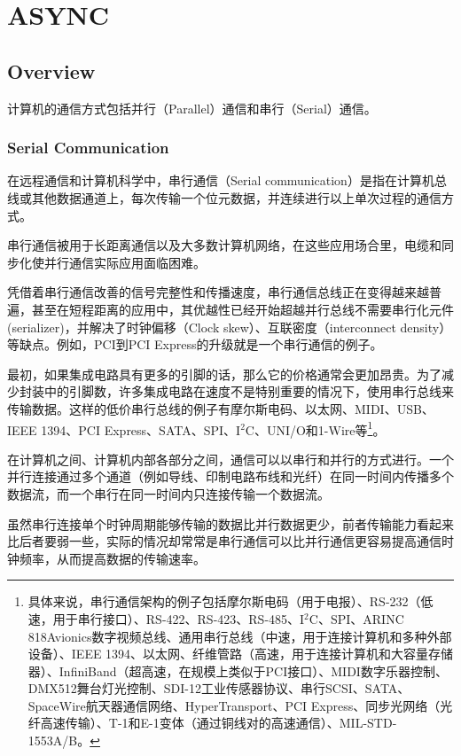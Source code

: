\part{ASYNC}


\chapter{Overview}


计算机的通信方式包括并行（Parallel）通信和串行（Serial）通信。


\section{Serial Communication}

在远程通信和计算机科学中，串行通信（Serial communication）是指在计算机总线或其他数据通道上，每次传输一个位元数据，并连续进行以上单次过程的通信方式。

串行通信被用于长距离通信以及大多数计算机网络，在这些应用场合里，电缆和同步化使并行通信实际应用面临困难。

凭借着串行通信改善的信号完整性和传播速度，串行通信总线正在变得越来越普遍，甚至在短程距离的应用中，其优越性已经开始超越并行总线不需要串行化元件(serializer)，并解决了时钟偏移（Clock skew）、互联密度（interconnect density）等缺点。例如，PCI到PCI Express的升级就是一个串行通信的例子。

最初，如果集成电路具有更多的引脚的话，那么它的价格通常会更加昂贵。为了减少封装中的引脚数，许多集成电路在速度不是特别重要的情况下，使用串行总线来传输数据。这样的低价串行总线的例子有摩尔斯电码、以太网、MIDI、USB、IEEE 1394、PCI Express、SATA、SPI、I$^2$C、UNI/O和1-Wire等\footnote{具体来说，串行通信架构的例子包括摩尔斯电码（用于电报）、RS-232（低速，用于串行接口）、RS-422、RS-423、RS-485、I$^2$C、SPI、ARINC 818Avionics数字视频总线、通用串行总线（中速，用于连接计算机和多种外部设备）、IEEE 1394、以太网、纤维管路（高速，用于连接计算机和大容量存储器）、InfiniBand（超高速，在规模上类似于PCI接口）、MIDI数字乐器控制、DMX512舞台灯光控制、SDI-12工业传感器协议、串行SCSI、SATA、SpaceWire航天器通信网络、HyperTransport、PCI Express、同步光网络（光纤高速传输）、T-1和E-1变体（通过铜线对的高速通信）、MIL-STD-1553A/B。}。

在计算机之间、计算机内部各部分之间，通信可以以串行和并行的方式进行。一个并行连接通过多个通道（例如导线、印制电路布线和光纤）在同一时间内传播多个数据流，而一个串行在同一时间内只连接传输一个数据流。

虽然串行连接单个时钟周期能够传输的数据比并行数据更少，前者传输能力看起来比后者要弱一些，实际的情况却常常是串行通信可以比并行通信更容易提高通信时钟频率，从而提高数据的传输速率。

